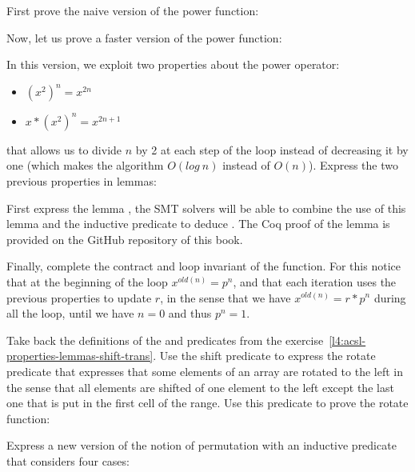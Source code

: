 First prove the naive version of the power function:




Now, let us prove a faster version of the power function:




In this version, we exploit two properties about the power operator:


\begin{itemize}
\item $(x^2)^n = x^{2n}$
\item $x * (x^2)^n = x^{2n+1}$
\end{itemize}


that allows us to divide $n$ by 2 at each step of the loop instead of decreasing
it by one (which makes the algorithm $O(log\ n)$ instead of $O(n)$). Express the
two previous properties in lemmas:




First express the lemma , the SMT solvers will be able
to combine the use of this lemma and the inductive predicate to deduce
. The Coq proof of the  lemma is
provided on the GitHub repository of this book.


Finally, complete the contract and loop invariant of the 
function. For this notice that at the beginning of the loop $x^{old(n)} = p^n$,
and that each iteration uses the previous properties to update $r$, in the sense
that we have $x^{old(n)} = r * p^n$ during all the loop, until we have $n = 0$ and
thus $p^n = 1$.




Take back the definitions of the  and 
predicates from the exercise~\ref{l4:acsl-properties-lemmas-shift-trans}. Use the
shift predicate to express the rotate predicate that expresses that some elements
of an array are rotated to the left in the sense that all elements are shifted of
one element to the left except the last one that is put in the first cell of the
range. Use this predicate to prove the rotate function:




Express a new version of the notion of permutation with an inductive predicate
that considers four cases:

